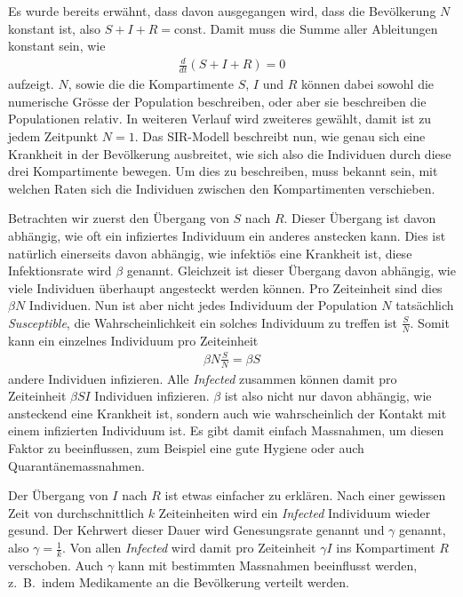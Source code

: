 \begin{refsection}
Es wurde bereits erwähnt, dass davon ausgegangen wird, dass die Bevölkerung $N$ konstant ist, also $S + I + R = \text{const}$. Damit muss die Summe aller Ableitungen konstant sein, wie
\begin{align*}
  \frac{d}{dt}\left(S+I+R\right) = 0
\end{align*}
aufzeigt. 
$N$, sowie die die Kompartimente $S$, $I$ und $R$ können dabei sowohl die numerische Grösse der Population beschreiben, oder aber sie beschreiben die Populationen relativ. 
In weiteren Verlauf wird zweiteres gewählt, damit ist zu jedem Zeitpunkt $N = 1$.
Das SIR-Modell beschreibt nun, wie genau sich eine Krankheit in der Bevölkerung ausbreitet, wie sich also die Individuen durch diese drei Kompartimente bewegen.
Um dies zu beschreiben, muss bekannt sein, mit welchen Raten sich die Individuen zwischen den Kompartimenten verschieben.

\begin{figure}[H]
  \centering
  
\end{figure}

Betrachten wir zuerst den Übergang von $S$ nach $R$.
Dieser Übergang ist davon abhängig, wie oft ein infiziertes Individuum ein anderes anstecken kann.
Dies ist natürlich einerseits davon abhängig, wie infektiös eine Krankheit ist, diese Infektionsrate wird $\beta$ genannt.
%
Gleichzeit ist dieser Übergang davon abhängig, wie viele Individuen überhaupt angesteckt werden können. 
Pro Zeiteinheit sind dies $\beta N$ Individuen.
Nun ist aber nicht jedes Individuum der Population $N$ tatsächlich \emph{Susceptible}, die Wahrscheinlichkeit ein solches Individuum zu treffen ist $\frac{S}{N}$.
Somit kann ein einzelnes Individuum pro Zeiteinheit 
\begin{align*}
  \beta N \frac{S}{N} = \beta S
\end{align*}
andere Individuen infizieren.
Alle \emph{Infected} zusammen können damit pro Zeiteinheit $\beta S I$ Individuen infizieren. 
$\beta$ ist also nicht nur davon abhängig, wie ansteckend eine Krankheit ist, sondern auch wie wahrscheinlich der Kontakt mit einem infizierten Individuum ist. 
Es gibt damit einfach Massnahmen, um diesen Faktor zu beeinflussen, zum Beispiel eine gute Hygiene oder auch Quarantänemassnahmen.

Der Übergang von $I$ nach $R$ ist etwas einfacher zu erklären. 
Nach einer gewissen Zeit von durchschnittlich $k$ Zeiteinheiten wird ein \emph{Infected} Individuum wieder gesund.
Der Kehrwert dieser Dauer wird Genesungsrate genannt und $\gamma$ genannt, also $\gamma = \frac{1}{k}$.
Von allen \emph{Infected} wird damit pro Zeiteinheit $\gamma I$ ins Kompartiment $R$ verschoben.
Auch $\gamma$ kann mit bestimmten Massnahmen beeinflusst werden, z.~B.~indem Medikamente an die Bevölkerung verteilt werden.


\end{refsection}
